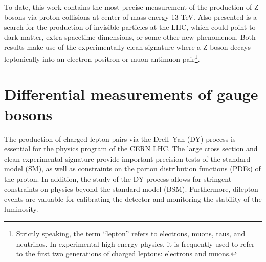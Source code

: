 To date, this work contains the most precise measurement of the production of Z bosons via proton collisions at center-of-mass energy 13 TeV.
Also presented is a search for the production of invisible particles at the LHC, which could
point to dark matter, extra spacetime dimensions, or some other new phenomenon.
Both results make use of the experimentally clean signature where a Z boson decays leptonically into an electron-positron or muon-antimuon pair\footnote{Strictly speaking, the term ``lepton'' refers to electrons, muons, taus, and neutrinos. In experimental high-energy physics, it is frequently used to refer to the first two generations of charged leptons: electrons and muons.}.

\section{Differential measurements of gauge bosons}
The production of charged lepton pairs via the Drell--Yan (DY) process 
is essential for the physics program of the CERN LHC.  
The large cross section and clean experimental signature %
provide important precision
tests of the standard model (SM),
as well as constraints on the 
parton distribution functions (PDFs) of the proton. In addition, the study of 
the DY process allows for stringent constraints on physics beyond the standard 
model (BSM).
Furthermore, dilepton events are valuable for calibrating the 
detector and monitoring the stability of the luminosity.

